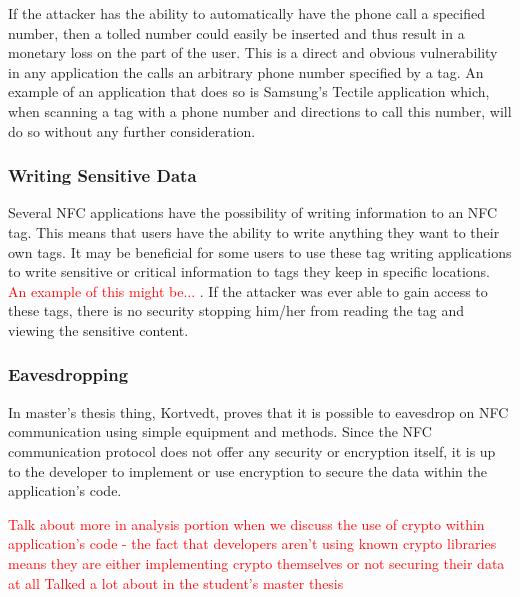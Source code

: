 \documentclass[12pt]{article}
\newcommand\TODO[1]{\textcolor{red}{#1}}
\begin{document}
If the attacker has the ability to automatically have the phone call a specified number, then a tolled number could easily be inserted and thus result in a monetary loss on the part of the user. This is a direct and obvious vulnerability in any application the calls an arbitrary phone number specified by a tag. An example of an application that does so is Samsung's Tectile application which, when scanning a tag with a phone number and directions to call this number, will do so without any further consideration. 

\subsubsection{Writing Sensitive Data}
Several NFC applications have the possibility of writing information to an NFC tag. This means that users have the ability to write anything they want to their own tags. It may be beneficial for some users to use these tag writing applications to write sensitive or critical information to tags they keep in specific locations. \TODO{An example of this might be... }. If the attacker was ever able to gain access to these tags, there is no security stopping him/her from reading the tag and viewing the sensitive content. 

\subsubsection{Eavesdropping}
In master's thesis thing, Kortvedt, proves that it is possible to eavesdrop on NFC communication using simple equipment and methods. Since the NFC communication protocol does not offer any security or encryption itself, it is up to the developer to implement or use encryption to secure the data within the application's code.

\TODO{Talk about more in analysis portion when we discuss the use of crypto within application's code - the fact that developers aren't using known crypto libraries means they are either implementing crypto themselves or not securing their data at all} 
\TODO{Talked a lot about in the student's master thesis}
\end{document}

